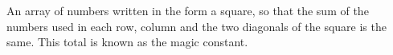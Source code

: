 An array of numbers written in the form a square, so that the 
sum of the numbers used in each row, column and the two diagonals of the square 
is the same.  
This total is known as the magic constant.
